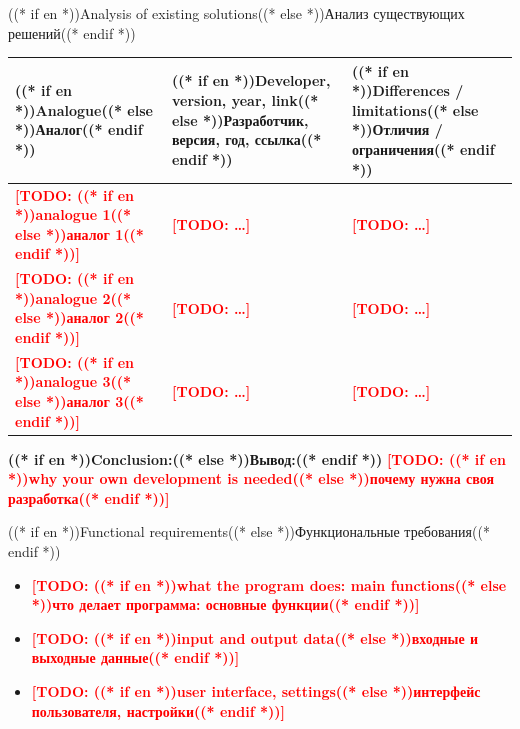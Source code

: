 \documentclass[aspectratio=169, 14pt]{beamer}
\newcommand{\todo}[1]{\textcolor{red}{\textbf{[TODO: #1]}}}
\begin{document}
\begin{frame}{((* if en *))Analysis of existing solutions((* else *))Анализ существующих решений((* endif *))}
  \begingroup\footnotesize
  \begin{tabularx}{\textwidth}{lXX}
    \toprule
    \textbf{((* if en *))Analogue((* else *))Аналог((* endif *))} &
    \textbf{((* if en *))Developer, version, year, link((* else *))Разработчик, версия, год, ссылка((* endif *))} &
    \textbf{((* if en *))Differences / limitations((* else *))Отличия / ограничения((* endif *))} \\
    \midrule
    \todo{((* if en *))analogue 1((* else *))аналог 1((* endif *))} & \todo{…} & \todo{…} \\
    \todo{((* if en *))analogue 2((* else *))аналог 2((* endif *))} & \todo{…} & \todo{…} \\
    \todo{((* if en *))analogue 3((* else *))аналог 3((* endif *))} & \todo{…} & \todo{…} \\
    \bottomrule
  \end{tabularx}%
  \endgroup

  \vspace{0.5em}
  {\color{hseblue}\textbf{((* if en *))Conclusion:((* else *))Вывод:((* endif *))}} \todo{((* if en *))why your own development is needed((* else *))почему нужна своя разработка((* endif *))}
\end{frame}

\begin{frame}{((* if en *))Functional requirements((* else *))Функциональные требования((* endif *))}
  \begin{itemize}
    \item \todo{((* if en *))what the program does: main functions((* else *))что делает программа: основные функции((* endif *))}
    \item \todo{((* if en *))input and output data((* else *))входные и выходные данные((* endif *))}
    \item \todo{((* if en *))user interface, settings((* else *))интерфейс пользователя, настройки((* endif *))}
  \end{itemize}
\end{frame}
\end{document}

